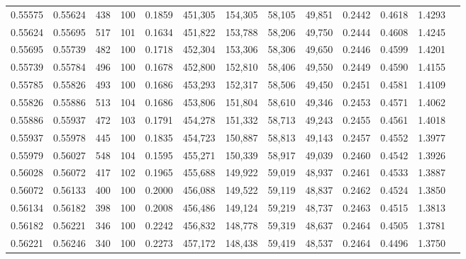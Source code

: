 \begin{tabular}{rrrrrrrrrrrrr}
0.55575 & 0.55624 &   438 & 100 &                                     0.1859 & 451,305 & 154,305 &  58,105 &  49,851 & 0.2442 & 0.4618 & 1.4293 \\
0.55624 & 0.55695 &   517 & 101 &                                     0.1634 & 451,822 & 153,788 &  58,206 &  49,750 & 0.2444 & 0.4608 & 1.4245 \\
0.55695 & 0.55739 &   482 & 100 &                                     0.1718 & 452,304 & 153,306 &  58,306 &  49,650 & 0.2446 & 0.4599 & 1.4201 \\
0.55739 & 0.55784 &   496 & 100 &                                     0.1678 & 452,800 & 152,810 &  58,406 &  49,550 & 0.2449 & 0.4590 & 1.4155 \\
0.55785 & 0.55826 &   493 & 100 &                                     0.1686 & 453,293 & 152,317 &  58,506 &  49,450 & 0.2451 & 0.4581 & 1.4109 \\
0.55826 & 0.55886 &   513 & 104 &                                     0.1686 & 453,806 & 151,804 &  58,610 &  49,346 & 0.2453 & 0.4571 & 1.4062 \\
0.55886 & 0.55937 &   472 & 103 &                                     0.1791 & 454,278 & 151,332 &  58,713 &  49,243 & 0.2455 & 0.4561 & 1.4018 \\
0.55937 & 0.55978 &   445 & 100 &                                     0.1835 & 454,723 & 150,887 &  58,813 &  49,143 & 0.2457 & 0.4552 & 1.3977 \\
0.55979 & 0.56027 &   548 & 104 &                                     0.1595 & 455,271 & 150,339 &  58,917 &  49,039 & 0.2460 & 0.4542 & 1.3926 \\
0.56028 & 0.56072 &   417 & 102 &                                     0.1965 & 455,688 & 149,922 &  59,019 &  48,937 & 0.2461 & 0.4533 & 1.3887 \\
0.56072 & 0.56133 &   400 & 100 &                                     0.2000 & 456,088 & 149,522 &  59,119 &  48,837 & 0.2462 & 0.4524 & 1.3850 \\
0.56134 & 0.56182 &   398 & 100 &                                     0.2008 & 456,486 & 149,124 &  59,219 &  48,737 & 0.2463 & 0.4515 & 1.3813 \\
0.56182 & 0.56221 &   346 & 100 &                                     0.2242 & 456,832 & 148,778 &  59,319 &  48,637 & 0.2464 & 0.4505 & 1.3781 \\
0.56221 & 0.56246 &   340 & 100 &                                     0.2273 & 457,172 & 148,438 &  59,419 &  48,537 & 0.2464 & 0.4496 & 1.3750 \\

\end{tabular}
